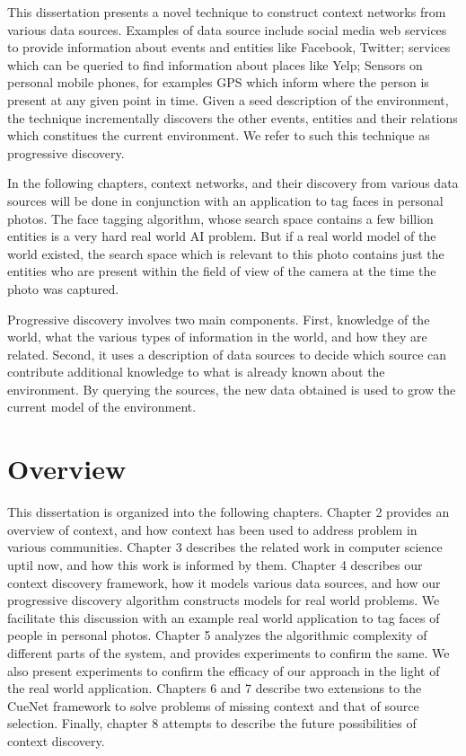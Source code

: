 This dissertation presents a novel technique to construct context networks from various data sources. Examples of data source include social media web services to provide information about events and entities like Facebook, Twitter; services which can be queried to find information about places like Yelp; Sensors on personal mobile phones, for examples GPS which inform where the person is present at any given point in time. Given a seed description of the environment, the technique incrementally discovers the other events, entities and their relations which constitues the current environment. We refer to such this technique as progressive discovery. 

In the following chapters, context networks, and their discovery from various data sources will be done in conjunction with an application to tag faces in personal photos. The face tagging algorithm, whose search space contains a few billion entities is a very hard real world AI problem. But if a real world model of the world existed, the search space which is relevant to this photo contains just the entities who are present within the field of view of the camera at the time the photo was captured.

Progressive discovery involves two main components. First, knowledge of the world, what the various types of information in the world, and how they are related. Second, it uses a description of data sources to decide which source can contribute additional knowledge to what is already known about the environment. By querying the sources, the new data obtained is used to grow the current model of the environment. 

\section{Overview}
This dissertation is organized into the following chapters. Chapter 2 provides an overview of context, and how context has been used to address problem in various communities. Chapter 3 describes the related work in computer science uptil now, and how this work is informed by them. Chapter 4 describes our context discovery framework, how it models various data sources, and how our progressive discovery algorithm constructs models for real world problems. We facilitate this discussion with an example real world application to tag faces of people in personal photos. Chapter 5 analyzes the algorithmic complexity of different parts of the system, and provides experiments to confirm the same. We also present experiments to confirm the efficacy of our approach in the light of the real world application. Chapters 6 and 7 describe two extensions to the CueNet framework to solve problems of missing context and that of source selection. Finally, chapter 8 attempts to describe the future possibilities of context discovery.

